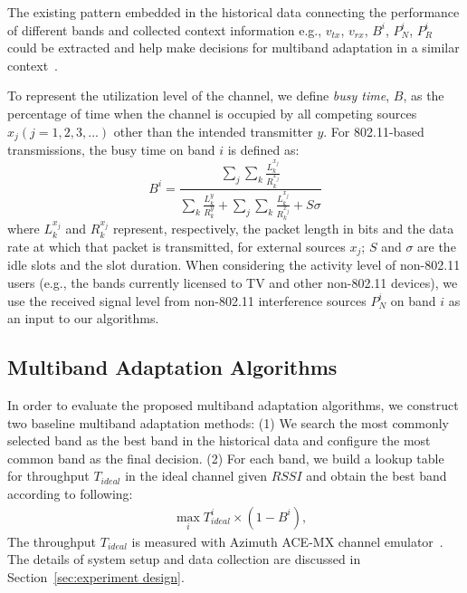 The existing pattern embedded in the historical data connecting 
the performance of different bands and collected context information 
e.g., $v_{tx}$, $v_{rx}$, $B^i$, $P_N^i$, $P_R^i$ 
could be extracted and help make decisions
for multiband adaptation in a similar context~\cite{meikle2012global}.


To represent the utilization level of the channel, we define \emph{busy time}, $B$,
as the percentage of time when the channel is occupied by 
all competing sources $x_j ( j = 1, 2, 3, ...)$ other than the intended transmitter $y$. 
For 802.11-based transmissions, the busy time on band $i$ is defined as:
\begin{equation}
\label{eqn:80211activity}
B^i = \frac{\sum_j{\sum_k{\frac{L_k^{x_j}}{R_k^{x_j}}}}}{\sum_k{\frac{L_k^y}{R_k^y}}+\sum_j{\sum_k{\frac{L_k^{x_j}}{R_k^{x_j}}}}+S\sigma}
\end{equation}
where $L_k^{x_j}$ and $R_k^{x_j}$ represent, respectively, the packet length in bits and the data
rate at which that packet is transmitted, for external sources $x_j$;
$S$ and $\sigma$ are the idle slots and the slot duration. 
When considering the activity level of non-802.11 users 
(e.g., the bands currently licensed to TV and other non-802.11 devices), 
we use the received signal level from non-802.11 interference sources $P_N^i$ 
on band $i$ as an input to our algorithms. 

\subsection{Multiband Adaptation Algorithms}
In order to evaluate the proposed multiband adaptation algorithms, 
we construct two baseline multiband adaptation methods: (1) We search the
most commonly selected band as the best band in the historical data
and configure the most common band as the final decision. (2) For each band, we build 
a lookup table for throughput $T_{ideal}$ in the ideal channel given $RSSI$ and obtain 
the best band according to following:
\begin{align}
&\max_i T_{ideal}^i\times(1-B^i),
\label{eq:baseline2}
\end{align}
The throughput $T_{ideal}$ is measured with Azimuth ACE-MX channel emulator~\cite{AzimuthACE}. 
The details of system setup and data collection are discussed in Section~\ref{sec:experiment design}. 

